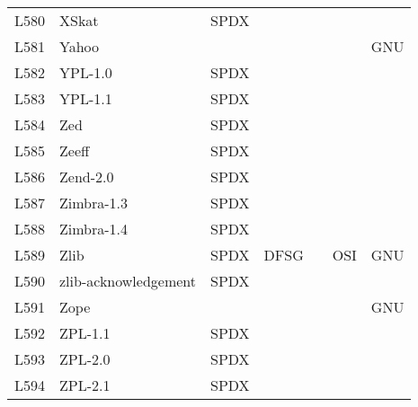 \begin{longtable}[h]{m{2cm} | m{7cm} | c | c | c | c | c}
L580 & XSkat & SPDX &  &  &  &  \\
L581 & Yahoo &  &  &  &  & GNU \\
L582 & YPL-1.0 & SPDX &  &  &  &  \\
L583 & YPL-1.1 & SPDX &  &  &  &  \\
L584 & Zed & SPDX &  &  &  &  \\
L585 & Zeeff & SPDX &  &  &  &  \\
L586 & Zend-2.0 & SPDX &  &  &  &  \\
L587 & Zimbra-1.3 & SPDX &  &  &  &  \\
L588 & Zimbra-1.4 & SPDX &  &  &  &  \\
L589 & Zlib & SPDX & DFSG &  & OSI & GNU \\
L590 & zlib-acknowledgement & SPDX &  &  &  &  \\
L591 & Zope &  &  &  &  & GNU \\
L592 & ZPL-1.1 & SPDX &  &  &  &  \\
L593 & ZPL-2.0 & SPDX &  &  &  &  \\
L594 & ZPL-2.1 & SPDX &  &  &  & 
\end{longtable}